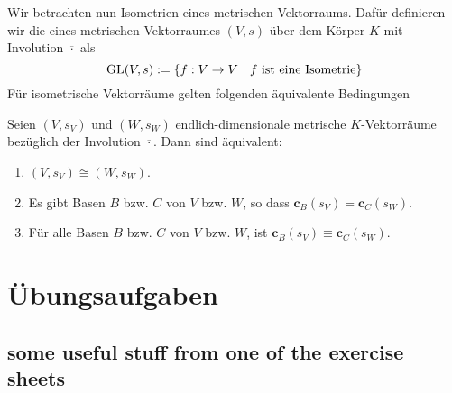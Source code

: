 \documentclass[11pt,twoside]{memoir}
\begin{document}
Wir betrachten nun Isometrien eines metrischen Vektorraums. Dafür definieren wir die  eines metrischen Vektorraumes $(V,s)$ über dem Körper $K$ mit Involution $\overline{\cdot}$ als
\[
\operatorname{GL}(V,s):= \{f:V\to V~|~ f~\text{ist eine Isometrie}\}
\]
Für isometrische Vektorräume gelten folgenden äquivalente Bedingungen
\begin{prop}
	Seien $(V,s_V)$ und $(W,s_W)$ endlich-dimensionale metrische $K$-Vektorräume bezüglich der Involution $\overline{\cdot}$. Dann sind äquivalent:
	\begin{enumerate}
		\item $(V,s_V)\cong (W,s_W)$.
		\item Es gibt Basen $B$ bzw. $C$ von $V$ bzw. $W$, so dass $\mathbf{c}_B(s_V) = \mathbf{c}_C(s_W)$.
		\item Für alle Basen $B$ bzw. $C$ von $V$ bzw. $W$, ist $\mathbf{c}_B(s_V) \equiv \mathbf{c}_C(s_W)$.
	\end{enumerate}
\end{prop}
\thispagestyle{rlast}


\appendix
\chapter{Übungsaufgaben}
\section{some useful stuff from one of the exercise sheets}
\backmatter
\printbibliography[heading = bibintoc]
\printindex
\end{document}
